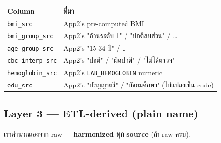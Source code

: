 \documentclass[11pt,a4paper]{article}
\begin{document}
\begin{center}
\footnotesize
\begin{tabularx}{\linewidth}{l X}
\toprule
\textbf{Column} & \textbf{ที่มา} \\
\midrule
\texttt{bmi\_src}            & App2's pre-computed BMI \\
\texttt{bmi\_group\_src}     & App2's "อ้วนระดับ 1" / "ปกติสมส่วน" / \ldots \\
\texttt{age\_group\_src}     & App2's "15-34 ปี" / \ldots \\
\texttt{cbc\_interp\_src}    & App2's "ปกติ" / "ผิดปกติ" / "ไม่ได้ตรวจ" \\
\texttt{hemoglobin\_src}     & App2's \texttt{LAB\_HEMOGLOBIN} numeric \\
\texttt{edu\_src}            & App2's "ปริญญาตรี" / "มัธยมศึกษา" (ไม่แปลงเป็น code) \\
\bottomrule
\end{tabularx}
\end{center}

\subsection{Layer 3 --- ETL-derived (plain name)}

เราคำนวณเองจาก raw --- \textbf{harmonized ทุก source} (ถ้า raw ครบ).
\end{document}
